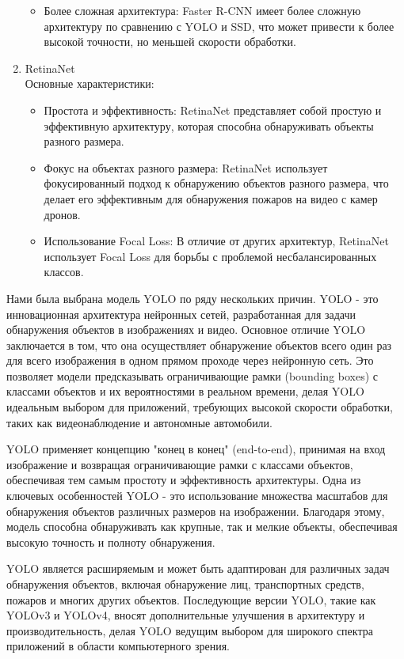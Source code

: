 \begin{enumerate}
\begin{itemize}
                \item Более сложная архитектура: Faster R-CNN имеет более сложную архитектуру по сравнению с YOLO и SSD, что может привести к более высокой точности, но меньшей скорости обработки.
            \end{itemize}
        \item RetinaNet \\
        Основные характеристики:
            \begin{itemize}
                \item Простота и эффективность: RetinaNet представляет собой простую и эффективную архитектуру, которая способна обнаруживать объекты разного размера.
                \item Фокус на объектах разного размера: RetinaNet использует фокусированный подход к обнаружению объектов разного размера, что делает его эффективным для обнаружения пожаров на видео с камер дронов.
                \item Использование Focal Loss: В отличие от других архитектур, RetinaNet использует Focal Loss для борьбы с проблемой несбалансированных классов.
            \end{itemize}
    \end{enumerate}

    Нами была выбрана модель YOLO по ряду нескольких причин. YOLO - это инновационная архитектура нейронных сетей, разработанная для задачи обнаружения объектов в изображениях и видео. Основное отличие YOLO заключается в том, что она осуществляет обнаружение объектов всего один раз для всего изображения в одном прямом проходе через нейронную сеть. Это позволяет модели предсказывать ограничивающие рамки (bounding boxes) с классами объектов и их вероятностями в реальном времени, делая YOLO идеальным выбором для приложений, требующих высокой скорости обработки, таких как видеонаблюдение и автономные автомобили.

    YOLO применяет концепцию "конец в конец" (end-to-end), принимая на вход изображение и возвращая ограничивающие рамки с классами объектов, обеспечивая тем самым простоту и эффективность архитектуры. Одна из ключевых особенностей YOLO - это использование множества масштабов для обнаружения объектов различных размеров на изображении. Благодаря этому, модель способна обнаруживать как крупные, так и мелкие объекты, обеспечивая высокую точность и полноту обнаружения.

    YOLO является расширяемым и может быть адаптирован для различных задач обнаружения объектов, включая обнаружение лиц, транспортных средств, пожаров и многих других объектов. Последующие версии YOLO, такие как YOLOv3 и YOLOv4, вносят дополнительные улучшения в архитектуру и производительность, делая YOLO ведущим выбором для широкого спектра приложений в области компьютерного зрения.


